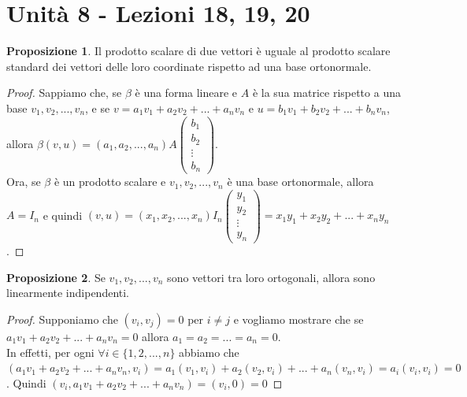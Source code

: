 \documentclass[a4paper]{article}
\theoremstyle{definition}
\newtheorem*{prop}{Proposizione}
\begin{document}
	\section{Unità 8  - Lezioni 18, 19, 20}

	\begin{prop}
		Il prodotto scalare di due vettori è uguale al prodotto scalare standard dei vettori delle loro coordinate rispetto ad una base ortonormale.
	\end{prop}
	\begin{proof}
		Sappiamo che, se $\beta$ è una forma lineare e $A$ è la sua matrice rispetto a una base $v_1, v_2, ..., v_n$, e se
		$v = a_1v_1 + a_2v_2 + ... + a_nv_n$ e $u = b_1v_1 + b_2v_2 + ... + b_nv_n$, allora $\beta(v, u) = (a_1, a_2, ..., a_n)A \begin{pmatrix}
			b_1 \\
			b_2 \\
			\vdots \\
			b_n
		\end{pmatrix}$. \\
		Ora, se $\beta$ è un prodotto scalare e $v_1, v_2, ..., v_n$ è una base ortonormale, allora $A = I_n$ e quindi $(v, u) = (x_1, x_2, ..., x_n)I_n \begin{pmatrix}
			y_1 \\
			y_2 \\
			\vdots \\
			y_n
		\end{pmatrix} = x_1y_1 + x_2y_2 + ... + x_ny_n$.
	\end{proof}

	\begin{prop}
		Se $v_1, v_2, ..., v_n$ sono vettori tra loro ortogonali, allora sono linearmente indipendenti.
	\end{prop}
	\begin{proof}
		Supponiamo che $(v_i, v_j) = 0$ per $i \ne j$ e vogliamo mostrare che se $a_1v_1 + a_2v_2 + ... + a_nv_n = 0$ allora $a_1 = a_2 = ... = a_n = 0$. \\
		In effetti, per ogni $\forall i \in \{1, 2, ..., n\}$ abbiamo che $(a_1v_1 + a_2v_2 + ... + a_nv_n, v_i) = a_1(v_1, v_i) + a_2(v_2, v_i) + ... + a_n(v_n, v_i) = a_i(v_i, v_i) = 0$.
		Quindi $(v_i, a_1v_1 + a_2v_2 + ... + a_nv_n) = (v_i, 0) = 0$
	\end{proof}
\end{document}

